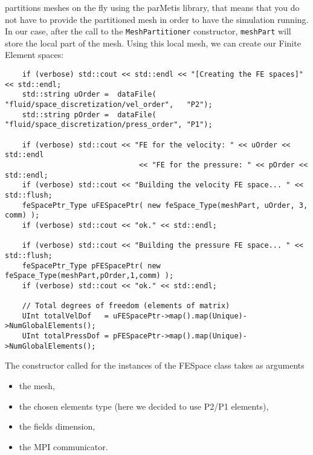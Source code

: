 \noindent \lifev partitions meshes on the fly
using the parMetis library, that means that you do not have to provide the partitioned mesh in
order to have the simulation running.
\noindent In our case, after the call to the \verb!MeshPartitioner!  constructor, \verb!meshPart! will store
the local part of the mesh. Using this local mesh, 
we can create our Finite Element spaces:

\begin{verbatim}
    if (verbose) std::cout << std::endl << "[Creating the FE spaces]" << std::endl;
    std::string uOrder =  dataFile( "fluid/space_discretization/vel_order",   "P2");
    std::string pOrder =  dataFile( "fluid/space_discretization/press_order", "P1");
    
    if (verbose) std::cout << "FE for the velocity: " << uOrder << std::endl
                               << "FE for the pressure: " << pOrder << std::endl;
    if (verbose) std::cout << "Building the velocity FE space... " << std::flush;
    feSpacePtr_Type uFESpacePtr( new feSpace_Type(meshPart, uOrder, 3, comm) );
    if (verbose) std::cout << "ok." << std::endl;

    if (verbose) std::cout << "Building the pressure FE space... " << std::flush;
    feSpacePtr_Type pFESpacePtr( new feSpace_Type(meshPart,pOrder,1,comm) );
    if (verbose) std::cout << "ok." << std::endl;

    // Total degrees of freedom (elements of matrix)
    UInt totalVelDof   = uFESpacePtr->map().map(Unique)->NumGlobalElements();
    UInt totalPressDof = pFESpacePtr->map().map(Unique)->NumGlobalElements();
\end{verbatim}

\noindent The constructor called for the instances of the FESpace class takes as arguments

\begin{itemize}
\item the mesh,
\item the chosen elements type (here we decided to use P2/P1 elements),
\item the fields dimension,
\item the MPI communicator.
\end{itemize}

